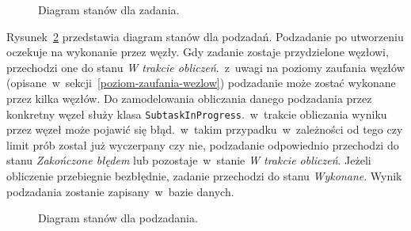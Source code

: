 \documentclass[a4paper,11pt,twoside]{report}
\theoremstyle{definition}
\begin{document}
\begin{figure} 
    \caption{Diagram stanów dla zadania.}
    \label{task-state-diagram}
\end{figure}

Rysunek~\ref{subtask-state-diagram} przedstawia diagram stanów dla podzadań. Podzadanie po utworzeniu oczekuje na wykonanie przez węzły. Gdy zadanie zostaje przydzielone węzłowi, przechodzi one do stanu \textit{W trakcie obliczeń}.~z~uwagi na poziomy zaufania węzłów (opisane~w~sekcji~\ref{poziom-zaufania-wezlow}) podzadanie może zostać wykonane przez kilka węzłów. Do zamodelowania obliczania danego podzadania przez konkretny węzeł służy klasa \texttt{SubtaskInProgress}.~w~trakcie obliczania wyniku przez węzeł może pojawić się błąd.~w~takim przypadku~w~zależności od tego czy limit prób został już wyczerpany czy nie, podzadanie odpowiednio przechodzi do stanu \textit{Zakończone błędem} lub pozostaje~w~stanie \textit{W trakcie obliczeń}. Jeżeli obliczenie przebiegnie bezbłędnie, zadanie przechodzi do stanu \textit{Wykonane}. Wynik podzadania zostanie zapisany~w~bazie danych.

\begin{figure} 
    \caption{Diagram stanów dla podzadania.}
    \label{subtask-state-diagram}
\end{figure}
\end{document}
